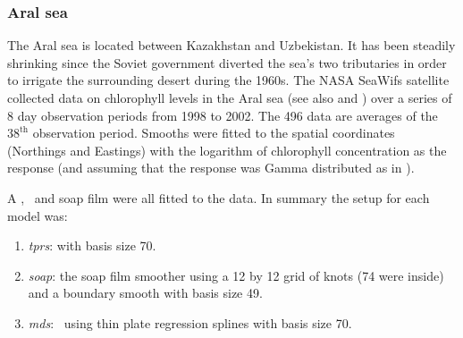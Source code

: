 \subsubsection{Aral sea}
\label{aral-sec}

The Aral sea is located between Kazakhstan and Uzbekistan. It has been steadily shrinking since the Soviet government diverted the sea's two tributaries in order to irrigate the surrounding desert during the 1960s. The NASA SeaWifs satellite collected data on chlorophyll levels in the Aral sea (see also  \label{cor-r43}and \cite{soap}) over a series of 8 day observation periods from 1998 to 2002. The 496 data are averages of the $38^\text{th}$ observation period. Smooths were fitted to the spatial coordinates (Northings and Eastings) with the logarithm of chlorophyll concentration as the response\label{cor-r44} (and assuming that the response was Gamma distributed as in \cite{soap}).

A \tprs, \mdsap\ and soap film were all fitted to the data. In summary the setup for each model was:
\begin{enumerate}
\item \emph{tprs}: \tprss with basis size 70.
\item \emph{soap}: the soap film smoother using a 12 by 12 grid of knots (74 were inside) and a boundary smooth with basis size 49.
\item \emph{mds}: \mdsap\ using thin plate regression splines with basis size 70.
\end{enumerate}

